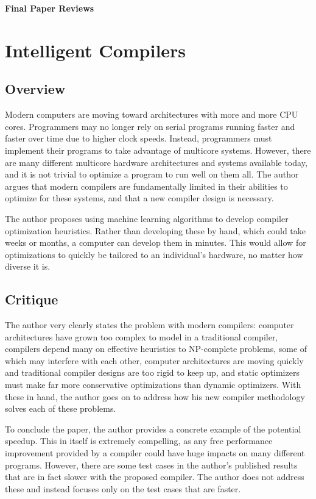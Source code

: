 \documentclass[12pt,letterpaper]{article}
\begin{document}
{\Large\center\textbf{Final Paper Reviews} \\}

\section{Intelligent Compilers}

\subsection{Overview}
Modern computers are moving toward architectures with more and more CPU cores.
Programmers may no longer rely on serial programs running faster and faster over
time due to higher clock speeds. Instead, programmers must implement their
programs to take advantage of multicore systems. However, there are many
different multicore hardware architectures and systems available today, and it
is not trivial to optimize a program to run well on them all. The author argues
that modern compilers are fundamentally limited in their abilities to optimize
for these systems, and that a new compiler design is necessary.

The author proposes using machine learning algorithms to develop compiler
optimization heuristics. Rather than developing these by hand, which could take
weeks or months, a computer can develop them in minutes. This would allow for
optimizations to quickly be tailored to an individual's hardware, no matter how
diverse it is.

\subsection{Critique}
The author very clearly states the problem with modern compilers: computer
architectures have grown too complex to model in a traditional compiler,
compilers depend many on effective heuristics to NP-complete problems, some of
which may interfere with each other, computer architectures are moving quickly
and traditional compiler designs are too rigid to keep up, and static
optimizers must make far more conservative optimizations than dynamic
optimizers. With these in hand, the author goes on to address how his new
compiler methodology solves each of these problems.

To conclude the paper, the author provides a concrete example of the potential
speedup. This in itself is extremely compelling, as any free performance
improvement provided by a compiler could have huge impacts on many different
programs. However, there are some test cases in the author's published results
that are in fact slower with the proposed compiler. The author does not address
these and instead focuses only on the test cases that are faster.
\end{document}
